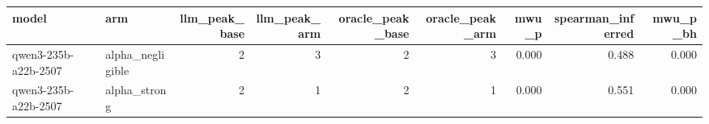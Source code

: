\begin{tabular}{llrrrrrrr}
\toprule
model & arm & llm_peak_base & llm_peak_arm & oracle_peak_base & oracle_peak_arm & mwu_p & spearman_inferred & mwu_p_bh \\
\midrule
qwen3-235b-a22b-2507 & alpha_negligible & 2 & 3 & 2 & 3 & 0.000 & 0.488 & 0.000 \\
qwen3-235b-a22b-2507 & alpha_strong & 2 & 1 & 2 & 1 & 0.000 & 0.551 & 0.000 \\
\bottomrule
\end{tabular}
